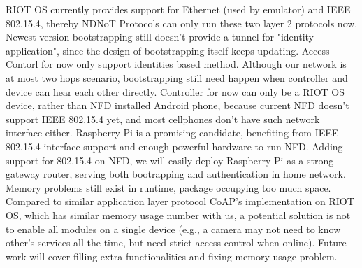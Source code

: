 \documentclass[sigconf]{acmart}
\begin{document}
RIOT OS currently provides support for Ethernet (used by emulator) and IEEE 802.15.4, thereby NDNoT Protocols can only run these two layer 2 protocols now.
Newest version bootstrapping still doesn't provide a tunnel for "identity application", since the design of bootstrapping itself keeps updating. Access Contorl 
for now only support identities based method. Although our network is at most two hops scenario, bootstrapping still need happen when controller and device can 
hear each other directly. Controller for now can only be a RIOT OS device, rather than NFD installed Android phone, because current NFD doesn't support IEEE 802.15.4 yet, 
and most cellphones don't have such network interface either. Raspberry Pi is a promising candidate, benefiting from IEEE 802.15.4 interface support and enough powerful hardware to run 
NFD. Adding support for 802.15.4 on NFD, we will easily deploy Raspberry Pi as a strong gateway router, serving both bootrapping and authentication in home 
network. Memory problems still exist in runtime, package occupying too much space. Compared to similar application layer protocol CoAP's implementation 
on RIOT OS, which has similar memory usage number with us, a potential solution is not to enable all modules on a single device (e.g., a camera may not need to know other's 
services all the time, but need strict access control when online). Future work will cover filling extra functionalities and fixing memory usage problem. 



\end{document}
